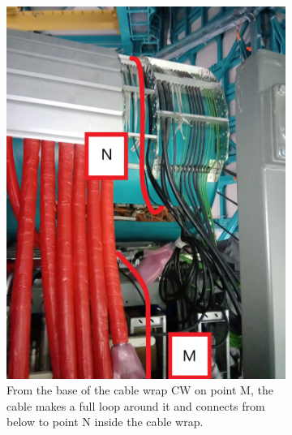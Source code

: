\newpage
  \begin{figure}
    \centering
    \begin{subfigure}{0.45\textwidth}
      \centering
      \includegraphics[width=\textwidth]{images/28.jpg}
      \caption*{From the base of the cable wrap CW on point M, the cable makes a full loop around it and connects from below to point N inside the cable wrap.}
    \end{subfigure}
    \hfill
    \begin{subfigure}{0.45\textwidth}
      \centering

\end{subfigure}
\end{figure}
